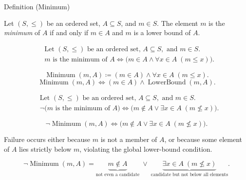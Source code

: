 \begin{definitionbox}{Definition (Minimum)}
\begin{definition}[Minimum]
\label{def:minimum}
Let $(S,\le)$ be an ordered set, $A\subseteq S$, and $m\in S$. The element $m$ is the \emph{minimum} of $A$ if and only if $m\in A$ and $m$ is a lower bound of $A$.
\end{definition}
\end{definitionbox}

\begin{remark*}
\[
\begin{aligned}
&\text{Let }(S,\le)\text{ be an ordered set, }A\subseteq S,\text{ and }m\in S.\\
&m \text{ is the minimum of }A
\Longleftrightarrow
\bigl(m\in A \land \forall x\in A\;(m\le x)\bigr).
\end{aligned}
\]
\end{remark*}

\begin{remark*}
\[
\operatorname{Minimum}(m,A)\coloneqq (m\in A)\land \forall x\in A\;(m\le x).
\]
\[
\operatorname{Minimum}(m,A)\Longleftrightarrow (m\in A)\land \operatorname{LowerBound}(m,A).
\]
\end{remark*}

\begin{remark*}
\[
\begin{aligned}
&\text{Let }(S,\le)\text{ be an ordered set, }A\subseteq S,\text{ and }m\in S.\\
&\neg\bigl(m \text{ is the minimum of }A\bigr)
\Longleftrightarrow
\bigl(m\notin A \lor \exists x\in A\;(m\nleq x)\bigr).
\end{aligned}
\]
\end{remark*}

\begin{remark*}
\[
\neg\operatorname{Minimum}(m,A)\Longleftrightarrow \bigl(m\notin A \lor \exists x\in A\;(m\nleq x)\bigr).
\]
\end{remark*}

\begin{remark*}
Failure occurs either because $m$ is not a member of $A$, or because some element of $A$ lies strictly below $m$, violating the global lower-bound condition.
\end{remark*}

\begin{remark*}
\[
\neg\operatorname{Minimum}(m,A)=
\underbrace{m\notin A}_{\text{not even a candidate}}
\;\lor\;
\underbrace{\exists x\in A\;(m\nleq x)}_{\text{candidate but not below all elements}}.
\]
\end{remark*}

